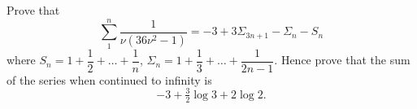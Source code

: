 Prove that
\[
\sum_{1}^{n} \frac{1}{\nu(36\nu^{2} - 1)}
  = -3 + 3\Sigma_{3n+1} - \Sigma_{n} - S_{n}
\]
where $S_{n} = 1 + \dfrac{1}{2} + \dots + \dfrac{1}{n}$, $\Sigma_{n} = 1 + \dfrac{1}{3} + \dots + \dfrac{1}{2n - 1}$. Hence prove that the sum
of the series when continued to infinity is
\[
-3 + \tfrac{3}{2}\log 3 + 2\log 2.
\]

